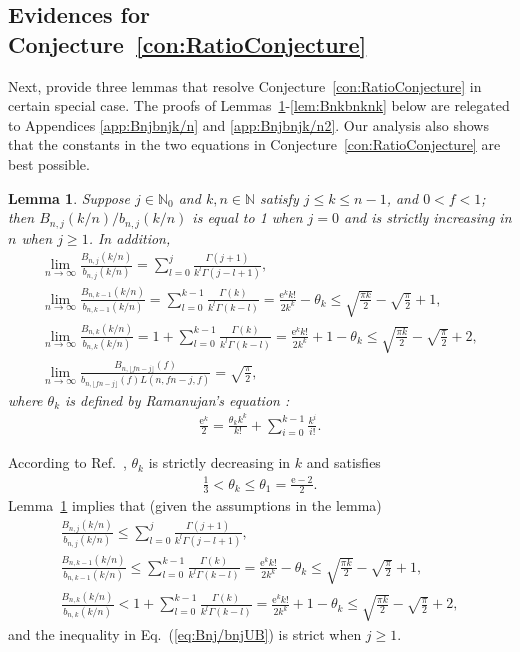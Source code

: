 \documentclass[aop]{imsart}
\theoremstyle{plain}
\newtheorem{lemma}[theorem]{Lemma}
\theoremstyle{remark}
\newcommand{\rme}{\mathrm{e}}
\newcommand{\bbN}{\mathbb{N}}
\newcommand{\1}{\operatorname{\uppercase\expandafter{\romannumeral1}}}
\newcommand{\2}{\operatorname{\uppercase\expandafter{\romannumeral2}}}
\newcommand{\3}{\operatorname{\uppercase\expandafter{\romannumeral3}}}
\newcommand{\4}{\operatorname{\uppercase\expandafter{\romannumeral4}}}
\newcommand{\5}{\operatorname{\uppercase\expandafter{\romannumeral5}}}
\newcommand{\6}{\operatorname{\uppercase\expandafter{\romannumeral6}}}
\newcommand{\7}{\operatorname{\uppercase\expandafter{\romannumeral7}}}
\newcommand{\8}{\operatorname{\uppercase\expandafter{\romannumeral8}}}
\newcommand{\9}{\operatorname{\uppercase\expandafter{\romannumeral9}}}
\newcommand{\eref}[1]{Eq.~\textup{(\ref{#1})}}
\newcommand{\Lref}[1]{Lemma~\ref{#1}}
\newcommand{\lsref}[1]{Lemmas~\ref{#1}}
\newcommand{\cref}[1]{Conjecture~\ref{#1}}
\newcommand{\rcite}[1]{Ref.~\cite{#1}}
\begin{document}
\subsection{Evidences for \cref{con:RatioConjecture}}
Next, provide three lemmas that resolve \cref{con:RatioConjecture} in certain special case. The proofs of  \lsref{lem:Bnjbnjk/n}-\ref{lem:Bnkbnknk} below are relegated to Appendices \ref{app:Bnjbnjk/n} and \ref{app:Bnjbnjk/n2}. 
Our analysis also shows that the constants in the two equations in \cref{con:RatioConjecture} are best possible. 

\begin{lemma}\label{lem:Bnjbnjk/n}
	Suppose $j\in \bbN_0$ and $k,n\in \bbN$ satisfy $j\leq k\leq n-1$, and $0<f<1$; then $B_{n,j}(k/n)/b_{n,j}(k/n)$ is equal to 1 when $j=0$ and is strictly increasing in $n$ when $j\geq 1$. In addition,
\begin{gather}
\lim_{n\to\infty}\frac{B_{n,j}(k/n)}{b_{n,j}(k/n)}=\sum_{l=0}^{j}\frac{\Gamma(j+1)}{k^l\Gamma(j-l+1)}, \label{eq:Bnj/bnjlim}\\
\lim_{n\to\infty}\frac{B_{n,k-1}(k/n)}{b_{n,k-1}(k/n)}
=\sum_{l=0}^{k-1}\frac{\Gamma(k)}{k^l\Gamma(k-l) }
=\frac{\rme^k k!}{2k^k}-\theta_k
\leq \sqrt{\frac{\pi k}{2}}-\sqrt{\frac{\pi }{2}}+1
,\label{eq:Bnkbnkm1lim}\\
\lim_{n\to\infty}\frac{B_{n,k}(k/n)}{b_{n,k}(k/n)}
=1+\sum_{l=0}^{k-1}\frac{\Gamma(k)}{k^l\Gamma(k-l) }=\frac{\rme^k k!}{2k^k}+1-\theta_k 
\leq  \sqrt{\frac{\pi k}{2}}-\sqrt{\frac{\pi }{2}}+2,\label{eq:Bnkbnknklim}\\
\lim_{n\to\infty}\frac{B_{n,\lfloor fn-j\rfloor}(f)}{b_{n,\lfloor fn-j\rfloor}(f)L(n,fn-j,f)}= \sqrt{\frac{\pi }{2}}, \label{eq:Bnfbnfnflim}
\end{gather}	
where $\theta_k$ is defined by  Ramanujan's equation \cite{Rama27,JogdS68}:
	\begin{align}\label{eq:Ramanujan}
	\frac{\rme^k}{2}=\frac{\theta_k k^k}{k!}+\sum_{i=0}^{k-1} \frac{k^i}{i!}.
	\end{align}
\end{lemma}


According to \rcite{Szeg28,Wats29}, $\theta_k$ is strictly decreasing in $k$ and satisfies 
\begin{align}\label{eq:thetakLBUB}
\frac{1}{3}<\theta_k\leq \theta_1=\frac{\rme-2}{2}. 
\end{align}
\Lref{lem:Bnjbnjk/n} implies that (given the assumptions in the lemma)
\begin{gather}
\frac{B_{n,j}(k/n)}{b_{n,j}(k/n)}\leq \sum_{l=0}^{j}\frac{\Gamma(j+1)}{k^l\Gamma(j-l+1)}, \label{eq:Bnj/bnjUB}\\
\frac{B_{n,k-1}(k/n)}{b_{n,k-1}(k/n)}
\leq \sum_{l=0}^{k-1}\frac{\Gamma(k)}{k^l\Gamma(k-l) }
=\frac{\rme^k k!}{2k^k}-\theta_k
\leq \sqrt{\frac{\pi k}{2}}-\sqrt{\frac{\pi }{2}}+1, \\
\frac{B_{n,k}(k/n)}{b_{n,k}(k/n)}
< 1+\sum_{l=0}^{k-1}\frac{\Gamma(k)}{k^l\Gamma(k-l) }=\frac{\rme^k k!}{2k^k}+1-\theta_k 
\leq  \sqrt{\frac{\pi k}{2}}-\sqrt{\frac{\pi }{2}}+2,
\end{gather}
and the inequality in \eref{eq:Bnj/bnjUB} is strict when $j\geq 1$.
\end{document}

